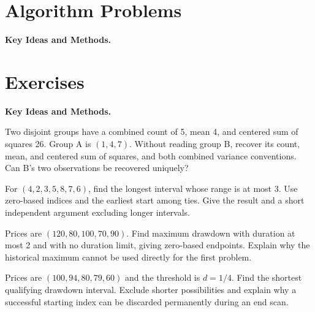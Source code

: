 \section{Algorithm Problems}
\noindent\textbf{Key Ideas and Methods.}\enspace





\pagebreak
\section{Exercises}
\noindent\textbf{Key Ideas and Methods.}\enspace


Two disjoint groups have a combined count of 5, mean 4, and centered sum of squares 26. Group A is $(1,4,7)$. Without reading group B, recover its count, mean, and centered sum of squares, and both combined variance conventions. Can B's two observations be recovered uniquely?

For $(4,2,3,5,8,7,6)$, find the longest interval whose range is at most 3. Use zero-based indices and the earliest start among ties. Give the result and a short independent argument excluding longer intervals.

Prices are $(120,80,100,70,90)$. Find maximum drawdown with duration at most 2 and with no duration limit, giving zero-based endpoints. Explain why the historical maximum cannot be used directly for the first problem.

Prices are $(100,94,80,79,60)$ and the threshold is $d=1/4$. Find the shortest qualifying drawdown interval. Exclude shorter possibilities and explain why a successful starting index can be discarded permanently during an end scan.
